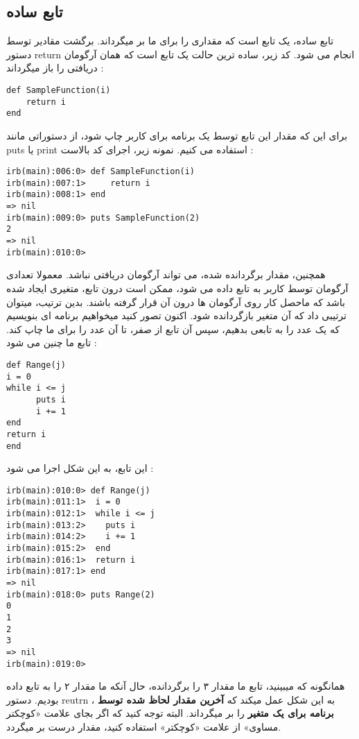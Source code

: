 \documentclass[11pt]{article}
\begin{document}
\subsection{تابع ساده}
تابع ساده، یک تابع است که مقداری را برای ما بر میگرداند. برگشت مقادیر توسط دستور return انجام می شود. کد زیر، ساده ترین حالت یک تابع است که همان آرگومان دریافتی را باز میگرداند :
\begin{latin}
\begin{verbatim}
def SampleFunction(i)
	return i
end
\end{verbatim}
\end{latin}
برای این که مقدار این تابع توسط یک برنامه برای کاربر چاپ شود، از دستوراتی مانند puts یا print استفاده می کنیم. نمونه زیر، اجرای کد بالاست :
\begin{latin}
\begin{verbatim}
irb(main):006:0> def SampleFunction(i)
irb(main):007:1>     return i
irb(main):008:1> end
=> nil
irb(main):009:0> puts SampleFunction(2)
2
=> nil
irb(main):010:0>
\end{verbatim}
\end{latin}
همچنین، مقدار برگردانده شده، می تواند آرگومان دریافتی نباشد. معمولا تعدادی آرگومان توسط کاربر به تابع داده می شود، ممکن است درون تابع، متغیری ایجاد شده باشد که ماحصل کار روی آرگومان ها درون آن قرار گرفته باشند. بدین ترتیب، میتوان ترتیبی داد که آن متغیر بازگردانده شود. اکنون تصور کنید میخواهیم برنامه ای بنویسیم که یک عدد را به تابعی بدهیم، سپس آن تابع از صفر، تا آن عدد را برای ما چاپ کند. تابع ما چنین می شود :
\begin{latin}
\begin{verbatim}
def Range(j)
i = 0
while i <= j 
      puts i
      i += 1
end
return i
end
\end{verbatim}
\end{latin}
این تابع، به این شکل اجرا می شود :
\begin{latin}
\begin{verbatim}
irb(main):010:0> def Range(j)
irb(main):011:1>  i = 0 
irb(main):012:1>  while i <= j
irb(main):013:2>    puts i
irb(main):014:2>    i += 1
irb(main):015:2>  end
irb(main):016:1>  return i
irb(main):017:1> end
=> nil
irb(main):018:0> puts Range(2)
0
1
2
3
=> nil
irb(main):019:0> 
\end{verbatim}
\end{latin}
همانگونه که میبینید، تابع ما مقدار ۳ را برگردانده، حال آنکه ما مقدار ۲ را به تابع داده بودیم. دستور reutrn ، به این شکل عمل میکند که 
\textbf{آخرین مقدار لحاظ شده توسط برنامه برای یک متغیر}
را بر میگرداند. البته توجه کنید که اگر بجای علامت «کوچکتر مساوی» از علامت «کوچکتر» استفاده کنید، مقدار درست بر میگردد. 
\end{document}
